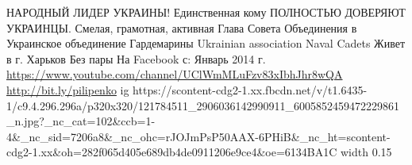  
 
 
 
 

\par
НАРОДНЫЙ ЛИДЕР УКРАИНЫ! Единственная кому ПОЛНОСТЬЮ ДОВЕРЯЮТ УКРАИНЦЫ. Смелая, грамотная, активная
Глава Совета Объединения в Украинское объединение Гардемарины Ukrainian association Naval Cadets
Живет в г. Харьков
Без пары
На Facebook с: Январь 2014 г.
\url{https://www.youtube.com/channel/UClWmMLuFzv83xIbhJhr8wQA}
\url{http://bit.ly/pilipenko}
\ifcmt
  ig https://scontent-cdg2-1.xx.fbcdn.net/v/t1.6435-1/c9.4.296.296a/p320x320/121784511_2906036142990911_6005852459472229861_n.jpg?_nc_cat=102&ccb=1-4&_nc_sid=7206a8&_nc_ohc=rJOJmPsP50AAX-6PHiB&_nc_ht=scontent-cdg2-1.xx&oh=282f065d405e689db4de0911206e9ce4&oe=6134BA1C
  width 0.15
\fi

